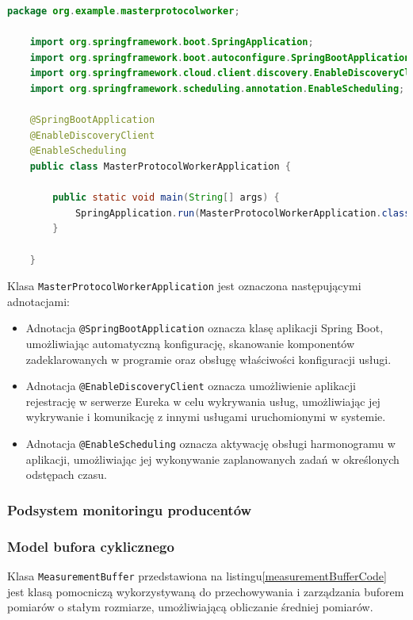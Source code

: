 \begin{lstlisting}[language=Java, caption=Główna klasa węzła protokołu, label=protocolWorkerMainClass]
    package org.example.masterprotocolworker;

    import org.springframework.boot.SpringApplication;
    import org.springframework.boot.autoconfigure.SpringBootApplication;
    import org.springframework.cloud.client.discovery.EnableDiscoveryClient;
    import org.springframework.scheduling.annotation.EnableScheduling;
    
    @SpringBootApplication
    @EnableDiscoveryClient
    @EnableScheduling
    public class MasterProtocolWorkerApplication {
    
        public static void main(String[] args) {
            SpringApplication.run(MasterProtocolWorkerApplication.class, args);
        }
    
    }
\end{lstlisting}

Klasa \verb|MasterProtocolWorkerApplication| jest oznaczona następującymi adnotacjami:
\begin{itemize}
    \item Adnotacja \verb|@SpringBootApplication| oznacza klasę aplikacji Spring Boot, umożliwiając automatyczną konfigurację, skanowanie komponentów zadeklarowanych w programie oraz obsługę właściwości konfiguracji usługi.
    \item Adnotacja \verb|@EnableDiscoveryClient| oznacza umożliwienie aplikacji rejestrację w serwerze Eureka w celu wykrywania usług, umożliwiając jej wykrywanie i komunikację z innymi usługami uruchomionymi w systemie.
    \item Adnotacja \verb|@EnableScheduling| oznacza aktywację obsługi harmonogramu w aplikacji, umożliwiając jej wykonywanie zaplanowanych zadań w określonych odstępach czasu.
\end{itemize}

\subsubsection{Podsystem monitoringu producentów}

\subsubsection{Model bufora cyklicznego}

Klasa \verb|MeasurementBuffer| przedstawiona na listingu\ref{measurementBufferCode} jest klasą pomocniczą wykorzystywaną do przechowywania i zarządzania buforem pomiarów o stałym rozmiarze, umożliwiającą obliczanie średniej pomiarów.

